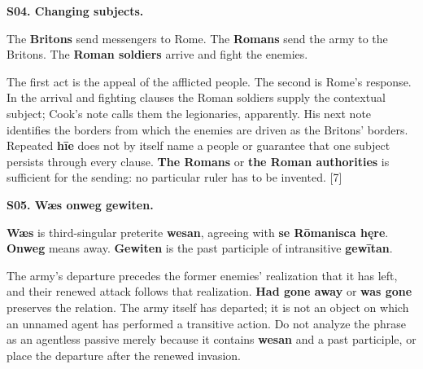 \par\begin{minipage}{\linewidth}\raggedright
\textbf{S04. Changing subjects.}

The \textbf{Britons} send messengers to Rome. The \textbf{Romans} send the army to the Britons. The \textbf{Roman soldiers} arrive and fight the enemies.

The first act is the appeal of the afflicted people. The second is Rome's response. In the arrival and fighting clauses the Roman soldiers supply the contextual subject; Cook's note calls them the legionaries, apparently. His next note identifies the borders from which the enemies are driven as the Britons' borders. Repeated \textbf{hīe} does not by itself name a people or guarantee that one subject persists through every clause. \textbf{The Romans} or \textbf{the Roman authorities} is sufficient for the sending: no particular ruler has to be invented. [7]

\end{minipage}\par\addvspace{4pt}

\par\begin{minipage}{\linewidth}\raggedright
\textbf{S05. Wæs onweg gewiten.}

\textbf{Wæs} is third-singular preterite \textbf{wesan}, agreeing with \textbf{se Rōmanisca hęre}. \textbf{Onweg} means away. \textbf{Gewiten} is the past participle of intransitive \textbf{gewītan}.

The army's departure precedes the former enemies' realization that it has left, and their renewed attack follows that realization. \textbf{Had gone away} or \textbf{was gone} preserves the relation. The army itself has departed; it is not an object on which an unnamed agent has performed a transitive action. Do not analyze the phrase as an agentless passive merely because it contains \textbf{wesan} and a past participle, or place the departure after the renewed invasion.

\end{minipage}\par\addvspace{4pt}


